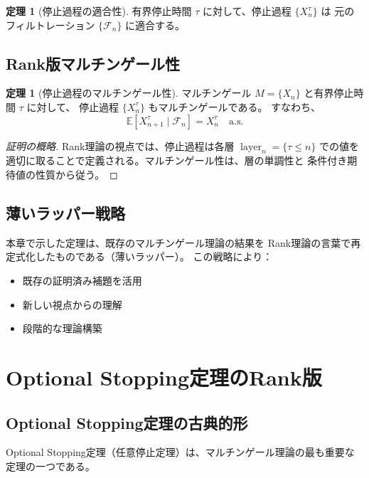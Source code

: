 \documentclass[a4paper,12pt]{ltjsarticle}
\theoremstyle{definition}
\newtheorem{theorem}[definition]{定理}
\newcommand{\E}{\mathbb{E}}
\newcommand{\F}{\mathcal{F}}
\DeclareMathOperator{\layer}{layer}
\begin{document}
\begin{theorem}[停止過程の適合性]
有界停止時間 $\tau$ に対して、停止過程 $\{X_n^{\tau}\}$ は
元のフィルトレーション $\{\F_n\}$ に適合する。
\end{theorem}

\subsection{Rank版マルチンゲール性}

\begin{theorem}[停止過程のマルチンゲール性]
\label{thm:stopped-martingale}
マルチンゲール $M = \{X_n\}$ と有界停止時間 $\tau$ に対して、
停止過程 $\{X_n^{\tau}\}$ もマルチンゲールである。
すなわち、
\[
\E[X_{n+1}^{\tau} \mid \F_n] = X_n^{\tau} \quad \text{a.s.}
\]
\end{theorem}

\begin{proof}[証明の概略]
Rank理論の視点では、停止過程は各層 $\layer_n = \{\tau \leq n\}$ での値を
適切に取ることで定義される。マルチンゲール性は、層の単調性と
条件付き期待値の性質から従う。
\end{proof}

\subsection{薄いラッパー戦略}

本章で示した定理は、既存のマルチンゲール理論の結果を
Rank理論の言葉で再定式化したものである（薄いラッパー）。
この戦略により：
\begin{itemize}
  \item 既存の証明済み補題を活用
  \item 新しい視点からの理解
  \item 段階的な理論構築
\end{itemize}

\section{Optional Stopping定理のRank版}

\subsection{Optional Stopping定理の古典的形}

Optional Stopping定理（任意停止定理）は、マルチンゲール理論の最も重要な定理の一つである。
\end{document}
